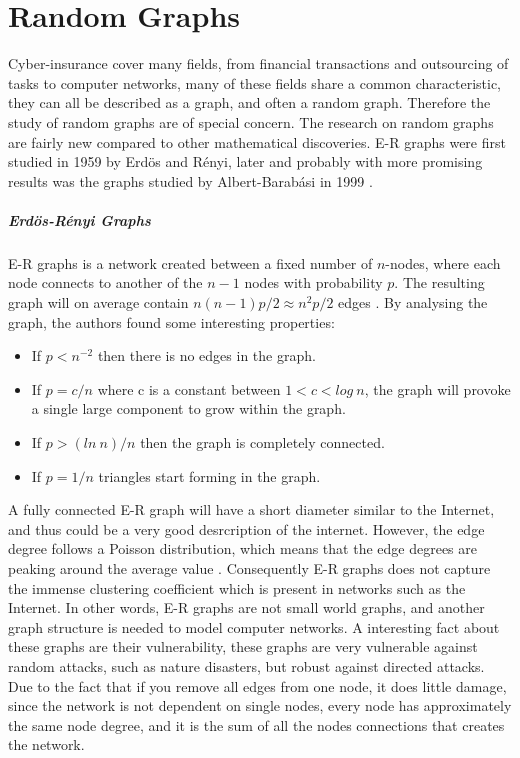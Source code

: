 \section{Random Graphs}
Cyber-insurance cover many fields, from financial transactions and outsourcing of tasks to computer networks, many of these fields share a common characteristic, they can all be described as a graph, and often a random graph. Therefore the study of random graphs are of special concern. The research on random graphs are fairly new compared to other mathematical discoveries. E-R graphs were first studied in 1959 by Erdös and Rényi, later and probably with more promising results was the graphs studied by Albert-Barabási in 1999 \cite{audestad}. 
\subparagraph{Erdös-Rényi Graphs}
E-R graphs is a network created between a fixed number of $n$-nodes, where each node connects to another of the $n-1$ nodes with 
probability $p$. The resulting graph will on average contain $n(n-1)p/2 \approx n^{2}p/2$ edges \cite{barabasi}. 
By analysing the graph, the authors found some interesting properties:

\begin{itemize}
\item If $p<n^{-2}$  then there is no edges in the graph. 
\item If $p=c/n$ where c is a constant between $1 < c < log\: n$, the graph will provoke a single large component to grow within the graph.
\item If $p>(ln\: n)/n$ then the graph is completely connected. 
\item If $p = 1/n$ triangles start forming in the graph. 
\end{itemize}

A fully connected E-R graph will have a short diameter similar to the Internet, and thus could be a very good desrcription of the internet. However, the edge degree follows a Poisson distribution, which means that the edge degrees are peaking around the average value \cite{audestad}. Consequently E-R graphs does not capture the immense clustering coefficient which is present in networks such as the Internet. In other words, E-R graphs are not small world graphs, and another graph structure is needed to model computer networks.
A interesting fact about these graphs are their vulnerability, these graphs are very vulnerable against random attacks, such as nature disasters, but robust against directed attacks. Due to the fact that if you remove all edges from one node, it does little damage, since the network is not dependent on single nodes, every node has approximately the same node degree, and it is the sum of all the nodes connections that creates the network.

